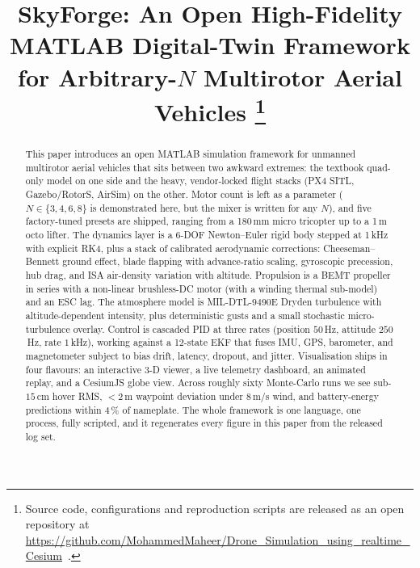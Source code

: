 \documentclass[a4paper, conference]{IEEEtran}
\begin{document}
\title{SkyForge: An Open High-Fidelity MATLAB Digital-Twin Framework for Arbitrary-$N$ Multirotor Aerial Vehicles
\thanks{Source code, configurations and reproduction scripts are released as an open repository at \url{https://github.com/MohammedMaheer/Drone_Simulation_using_realtime_Cesium}~\cite{repo}.}
}

\author{
}

\maketitle

\begin{abstract}
This paper introduces an open MATLAB simulation framework for
unmanned multirotor aerial vehicles that sits between two awkward
extremes: the textbook quad-only model on one side and the heavy,
vendor-locked flight stacks (PX4 SITL, Gazebo/RotorS, AirSim) on the
other. Motor count is left as a parameter ($N \in \{3,4,6,8\}$ is
demonstrated here, but the mixer is written for any $N$), and five
factory-tuned presets are shipped, ranging from a 180\,mm micro
tricopter up to a 1\,m octo lifter. The dynamics layer is a 6-DOF
Newton--Euler rigid body stepped at 1\,kHz with explicit RK4, plus a
stack of calibrated aerodynamic corrections: Cheeseman--Bennett ground
effect, blade flapping with advance-ratio scaling, gyroscopic
precession, hub drag, and ISA air-density variation with altitude.
Propulsion is a BEMT propeller in series with a non-linear brushless-DC
motor (with a winding thermal sub-model) and an ESC lag. The
atmosphere model is MIL-DTL-9490E Dryden turbulence with
altitude-dependent intensity, plus deterministic gusts and a small
stochastic micro-turbulence overlay. Control is cascaded PID at
three rates (position $50$\,Hz, attitude $250$\,Hz, rate $1$\,kHz),
working against a 12-state EKF that fuses IMU, GPS, barometer, and
magnetometer subject to bias drift, latency, dropout, and jitter.
Visualisation ships in four flavours: an interactive 3-D viewer, a
live telemetry dashboard, an animated replay, and a CesiumJS globe
view. Across roughly sixty Monte-Carlo runs we see sub-$15$\,cm
hover RMS, $<\!2$\,m waypoint deviation under $8$\,m/s wind, and
battery-energy predictions within $4$\,\% of nameplate. The whole
framework is one language, one process, fully scripted, and it
regenerates every figure in this paper from the released log set.
\end{abstract}
\end{document}

